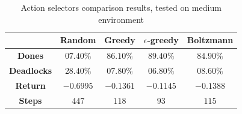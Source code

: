 \documentclass[a4paper,10pt]{report}
\begin{document}
\begin{table}[h]
	\center
	\begin{tabular}{|c|c|c|c|c|}
		\hline & \textbf{Random} & \textbf{Greedy} & \textbf{$\epsilon$-greedy} & \textbf{Boltzmann} \\ \hline
		\textbf{Dones}    & $07.40\%$ & $86.10\%$ & $89.40\%$ & $84.90\%$  \\ \hline
		\textbf{Deadlocks} & $28.40\%$ & $07.80\%$ & $06.80\%$ & $08.60\%$ \\ \hline
		\textbf{Return}    & $-0.6995$ & $-0.1361$ & $-0.1145$ & $-0.1388$ \\ \hline
		\textbf{Steps}     & $447$ & $118$ & $93$ & $115$ \\ \hline
	\end{tabular}
	\caption{Action selectors comparison results, tested on medium environment}
	\label{table:action-selectors-res}
\end{table}
\end{document}
